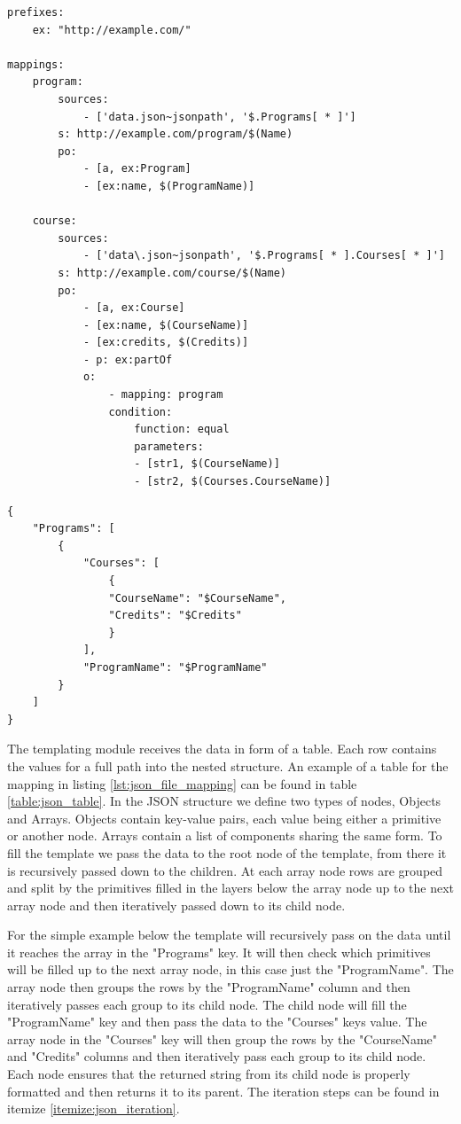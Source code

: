 \begin{lstlisting}[caption={Example YARRRML mapping for a JSON file}, label={lst:json_file_mapping}, captionpos=b, basicstyle=\small]
prefixes:
    ex: "http://example.com/"

mappings:
    program:
        sources:
            - ['data.json~jsonpath', '$.Programs[ * ]']
        s: http://example.com/program/$(Name)
        po:
            - [a, ex:Program]
            - [ex:name, $(ProgramName)]

    course:
        sources:
            - ['data\.json~jsonpath', '$.Programs[ * ].Courses[ * ]']
        s: http://example.com/course/$(Name)
        po:
            - [a, ex:Course]
            - [ex:name, $(CourseName)]
            - [ex:credits, $(Credits)]
            - p: ex:partOf
            o: 
                - mapping: program
                condition: 
                    function: equal
                    parameters:
                    - [str1, $(CourseName)]
                    - [str2, $(Courses.CourseName)]
\end{lstlisting}

\begin{lstlisting}[caption={Example JSON template}, label={lst:json_template}, captionpos=b, basicstyle=\small]
{
    "Programs": [
        {
            "Courses": [
                {
                "CourseName": "$CourseName",
                "Credits": "$Credits"
                }
            ],
            "ProgramName": "$ProgramName"
        }
    ]
}
\end{lstlisting}

The templating module receives the data in form of a table. Each row contains the values for a full path into the nested structure. An example of a table for the mapping in listing \ref{lst:json_file_mapping} can be found in table \ref{table:json_table}. In the JSON structure we define two types of nodes, Objects and Arrays. Objects contain key-value pairs, each value being either a primitive or another node. Arrays contain a list of components sharing the same form. To fill the template we pass the data to the root node of the template, from there it is recursively passed down to the children. At each array node rows are grouped and split by the primitives filled in the layers below the array node up to the next array node and then iteratively passed down to its child node.

For the simple example below the template will recursively pass on the data until it reaches the array in the "Programs" key. It will then check which primitives will be filled up to the next array node, in this case just the "ProgramName". The array node then groups the rows by the "ProgramName" column and then iteratively passes each group to its child node. The child node will fill the "ProgramName" key and then pass the data to the "Courses" keys value. The array node in the "Courses" key will then group the rows by the "CourseName" and "Credits" columns and then iteratively pass each group to its child node. Each node ensures that the returned string from its child node is properly formatted and then returns it to its parent. The iteration steps can be found in itemize \ref{itemize:json_iteration}.


